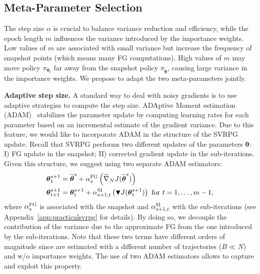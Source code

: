 \documentclass{article}
\theoremstyle{remark}
\theoremstyle{definition}
\newcommand{\vtheta}{\boldsymbol{\theta}}
\newcommand{\wt}[1]{\widetilde{#1}}
\newcommand{\wh}[1]{\widehat{#1}}
\begin{document}
\subsection{Meta-Parameter Selection}\label{sec:stopping}
The step size $\alpha$ is crucial to balance variance reduction and efficiency, while
the epoch length $m$ influences the variance introduced by the importance weights. Low values of $m$ are associated with small variance but increase the frequency of snapshot points (which means many FG computations). High values of $m$ may move policy $\pi_{\vtheta_t}$ far away from the snapshot policy $\pi_{\wt{\vtheta}}$, causing large variance in the importance weights. We propose to adapt the two meta-parameters jointly.

\textbf{Adaptive step size.}
A standard way to deal with noisy gradients is to use adaptive strategies to compute the step size.
ADAptive Moment estimation (ADAM)~\citep{kingma2014adam} stabilizes the parameter update by computing learning rates for each parameter based on an incremental estimate of the gradient variance.
Due to this feature, we would like to incorporate ADAM in the structure of the SVRPG update.
Recall that SVRPG performs two different updates of the parameters $\vtheta$: I) FG update in the snapshot; II) corrected gradient update in the sub-iterations.
Given this structure, we suggest using two separate ADAM estimators:
\begin{align*}
        \vtheta^{s+1}_1 &= \wt{\vtheta}^s + \alpha^{\textsc{FG}}_s\left(\wh{\nabla}_N J(\wt{\vtheta}^s) \right)\\
        \vtheta^{s+1}_{t+1} &= \vtheta^{s+1}_t + \alpha^{\textsc{SI}}_{s+1,t}\left( 
        \blacktriangledown J(\vtheta^{s+1}_t)\right)
        \text{ for $t=1,\dots,m-1$},
\end{align*}
where $\alpha^{\textsc{FG}}_{s}$ is associated with the snapshot and $\alpha^{\textsc{SI}}_{s+1,t}$ with the sub-iterations (see Appendix~\ref{app:practicalsvrpg} for details).
By doing so, we decouple the contribution of the variance due to the approximate FG from the one introduced by the sub-iterations.
Note that these two terms have different orders of magnitude since are estimated with a different number of trajectories ($B \ll N$) and w/o importance weights.
The use of two ADAM estimators allows to capture and exploit this property.
\end{document}
